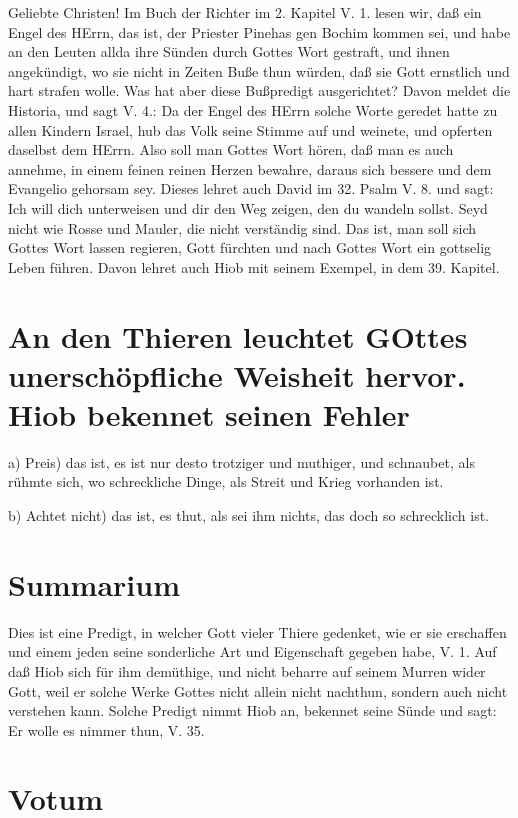 Geliebte Christen! Im Buch der Richter im 2. Kapitel V. 1. lesen wir, daß ein Engel des HErrn, das ist, der Priester Pinehas gen Bochim kommen sei, und habe an den Leuten allda ihre Sünden durch Gottes Wort gestraft, und ihnen angekündigt, wo sie nicht in Zeiten Buße thun würden, daß sie Gott ernstlich und hart strafen wolle. Was hat aber diese Bußpredigt ausgerichtet? Davon meldet die Historia, und sagt V. 4.: Da der Engel des HErrn solche Worte geredet hatte zu allen Kindern Israel, hub das Volk seine Stimme auf und weinete, und opferten daselbst dem HErrn. Also soll man Gottes Wort hören, daß man es auch annehme, in einem feinen reinen Herzen bewahre, daraus sich bessere und dem Evangelio gehorsam sey. Dieses lehret auch David im 32. Psalm V. 8. und sagt: Ich will dich unterweisen und dir den Weg zeigen, den du wandeln sollst. Seyd nicht wie Rosse und Mauler, die nicht verständig sind. Das ist, man soll sich Gottes Wort lassen regieren, Gott fürchten und nach Gottes Wort ein gottselig Leben führen. Davon lehret auch Hiob mit seinem Exempel, in dem 39. Kapitel.

\section[An den Thieren leuchtet GOttes unerschöpfliche Weisheit hervor.]{An den Thieren leuchtet GOttes unerschöpfliche Weisheit hervor. Hiob bekennet seinen Fehler}

a) Preis) das ist, es ist nur desto trotziger und muthiger, und schnaubet, als rühmte sich, wo schreckliche Dinge, als Streit und Krieg vorhanden ist.

b) Achtet nicht) das ist, es thut, als sei ihm nichts, das doch so schrecklich ist.

\section{Summarium}

Dies ist eine Predigt, in welcher Gott vieler Thiere gedenket, wie er sie erschaffen und einem jeden seine sonderliche Art und Eigenschaft gegeben habe, V. 1. Auf daß Hiob sich für ihm demüthige, und nicht beharre auf seinem Murren wider Gott, weil er solche Werke Gottes nicht allein nicht nachthun, sondern auch nicht verstehen kann. Solche Predigt nimmt Hiob an, bekennet seine Sünde und sagt: Er wolle es nimmer thun, V. 35.

\section{Votum}

